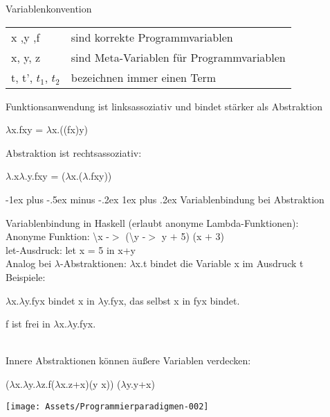 \documentclass[10pt]{article}
\makeatletter
\renewcommand{\subsubsection}{\@startsection{subsubsection}{3}{0mm}%
                                {-1ex plus -.5ex minus -.2ex}%
                                {1ex plus .2ex}%
                                {\normalfont\small\bfseries}}
\makeatother
\begin{document}
\begin{itemize*}
Variablenkonvention
\begin{tabular}[h]{ll}
  x ,y ,f             & \enspace \enspace sind korrekte Programmvariablen           \\
  x, y, z             & \enspace \enspace sind Meta-Variablen für Programmvariablen \\
  t, t', $t_1$, $t_2$ & \enspace  \enspace bezeichnen immer einen Term
  
\end{tabular}

Funktionsanwendung ist linksassoziativ und bindet stärker als Abstraktion

\begin{center}
  $\lambda$x.fxy = $\lambda$x.((fx)y)
\end{center}
Abstraktion ist rechtsassoziativ: 

\begin{center}
  $\lambda$.x$\lambda$.y.fxy = ($\lambda$x.($\lambda$.fxy))
\end{center}

\subsubsection{Variablenbindung bei Abstraktion}

Variablenbindung in Haskell (erlaubt anonyme Lambda-Funktionen): \\
\color{blue}Anonyme Funktion: \color{black} \textbackslash x -$>$ (\textbackslash y -$>$ y $+$ 5) (x $+$ 3)\\
\color{blue} let-Ausdruck: \color{black} let x = 5 in x+y\\

Analog bei $\lambda$-Abstraktionen: $\lambda$x.t bindet die Variable x im Ausdruck t\\
Beispiele: 
\begin{itemize*}
  \item $\lambda$x.$\lambda$y.fyx bindet x in $\lambda$y.fyx, das selbst x in fyx bindet.
  \item f ist frei in $\lambda$x.$\lambda$y.fyx.
\end{itemize*}
\ \\
Innere Abstraktionen können äußere Variablen verdecken: \ \\
\begin{center}
  ($\lambda$x.$\lambda$y.$\lambda$z.f($\lambda$x.z+x)(y x)) ($\lambda$y.y+x)
\end{center}
\begin{center}
  \texttt{[image: Assets/Programmierparadigmen-002]}
\end{center}


\end{itemize*}
\end{document}
